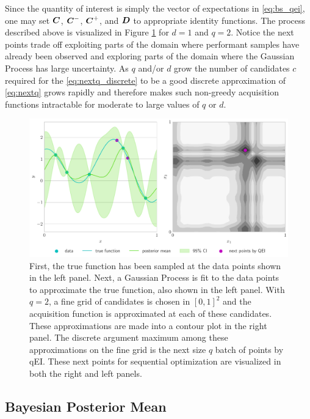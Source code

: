 \documentclass{article}[12pt]
\begin{document}
Since the quantity of interest is simply the vector of expectations in \eqref{eq:bs_qei}, one may set $\boldsymbol{C}$, $\boldsymbol{C}^-$, $\boldsymbol{C}^+$, and $\boldsymbol{D}$ to appropriate identity functions. The process described above is visualized in Figure \ref{fig:bo_qei} for $d=1$ and $q=2$. Notice the next points trade off exploiting parts of the domain where performant samples have already been observed and  exploring parts of the domain where the Gaussian Process has large uncertainty.  As $q$ and/or $d$ grow the number of candidates $c$ required for the \eqref{eq:nextq_discrete} to be a good discrete approximation of \eqref{eq:nextq} grows rapidly and therefore makes such non-greedy acquisition functions intractable for moderate to large values of $q$ or $d$.

\begin{figure}[H]
    \centering
    \includegraphics[width=\textwidth]{figs/gp.pdf}
    \caption{First, the true function has been sampled at the data points shown in the left panel. Next, a Gaussian Process is fit to the data points to approximate the true function, also shown in the left panel. With $q=2$, a fine grid of candidates is chosen in $[0,1]^{2}$ and the acquisition function is approximated at each of these candidates. These approximations are made into a contour plot in the right panel. The discrete argument maximum among these approximations on the fine grid is the next size $q$ batch of points by qEI. These next points for sequential optimization are visualized in both the right and left panels. }
    \label{fig:bo_qei}
\end{figure}

\subsection{Bayesian Posterior Mean}
\end{document}
